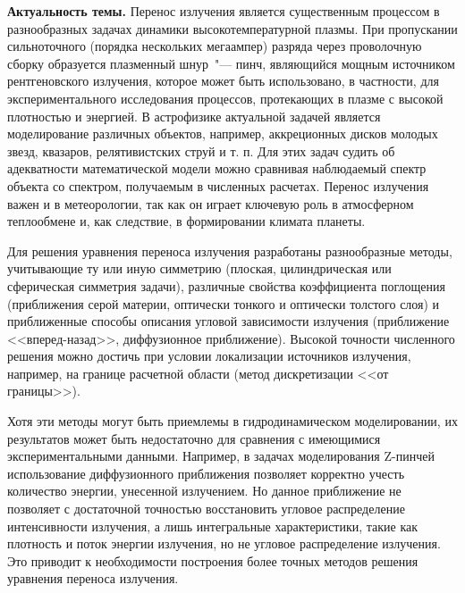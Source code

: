 \ifdisser
\newcommand{\actuality}{{\textbf{Актуальность темы.}}}
\newcommand{\develop}{{\textbf{Степень разработанности темы.}}}
\else
\newcommand{\actuality}{{\textbf{Актуальность и степень разработанности темы.}}}
\fi
\newcommand{\aim}{{\textbf{Целями}}}
\newcommand{\tasks}{{\textbf{задачи}}}
\newcommand{\novelty}{{\textbf{Научная новизна:}}}
\newcommand{\influence}{{\textbf{Теоретическая и практическая значимость работы:}}}
\newcommand{\methodology}{{\textbf{Методология и методы исследования.}}}
\newcommand{\defpositions}{{\textbf{Положения, выносимые на~защиту}}}
\ifdisser
\newcommand{\probation}{{\textbf{Степень достоверности и апробация результатов работы.}}}
\else
\newcommand{\probation}{{\textbf{Степень достоверности и апробация работы.}}}
\fi

{\actuality} Перенос излучения является существенным процессом в разнообразных задачах динамики высокотемпературной плазмы.
При пропускании сильноточного (порядка нескольких мегаампер) разряда через проволочную сборку образуется плазменный шнур~"--- пинч,
являющийся мощным источником рентгеновского излучения, которое может быть использовано, в частности, для экспериментального исследования процессов, протекающих в плазме с высокой плотностью и энергией. 
В астрофизике актуальной задачей является моделирование различных объектов, например, аккреционных дисков молодых звезд, квазаров, релятивистских струй и т. п.
Для этих задач судить об адекватности математической модели можно сравнивая наблюдаемый спектр объекта со спектром, получаемым в численных расчетах.
Перенос излучения важен и в метеорологии, так как он играет ключевую роль в атмосферном теплообмене и, как следствие, в формировании климата планеты.

Для решения уравнения переноса излучения разработаны разнообразные методы, учитывающие ту или иную симметрию (плоская, цилиндрическая или сферическая симметрия задачи), различные свойства коэффициента поглощения (приближения серой материи, оптически тонкого и оптически толстого слоя) и приближенные способы описания угловой зависимости излучения (приближение <<вперед-назад>>, диффузионное приближение). Высокой точности численного решения можно достичь при условии локализации источников излучения, например, на границе расчетной области (метод дискретизации <<от границы>>). 

Хотя эти методы могут быть приемлемы в гидродинамическом моделировании, их результатов может быть недостаточно для сравнения с имеющимися экспериментальными данными. Например, в задачах моделирования Z-пинчей использование диффузионного приближения позволяет корректно учесть количество энергии, унесенной излучением. Но данное приближение не позволяет с достаточной точностью восстановить угловое распределение интенсивности излучения, а лишь интегральные характеристики, такие как плотность и поток энергии излучения, но не угловое распределение излучения. Это приводит к необходимости построения более точных методов решения уравнения переноса излучения.

